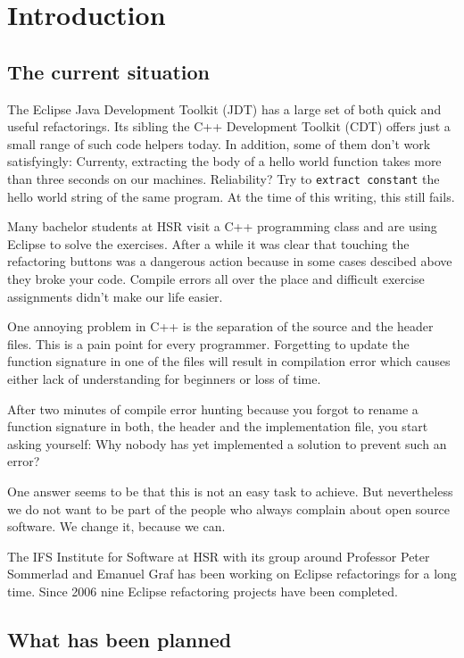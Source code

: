 \chapter{Introduction}
\thispagestyle{fancy}

\section{The current situation}

The Eclipse Java Development Toolkit (JDT) has a large set of both quick and
useful refactorings. Its sibling the C++ Development Toolkit (CDT) offers just a
small range of such code helpers today. In addition, some of them don't work
satisfyingly: Currenty, extracting the body of a hello world function takes more
than three seconds on our machines. Reliability? Try to \texttt{extract
constant} the hello world string of the same program. At the time of this 
writing, this still fails.

Many bachelor students at HSR visit a C++ programming class and are using 
Eclipse to solve the exercises. After a while it was clear that
touching the refactoring buttons was a dangerous action because in some cases
descibed above they broke your code. Compile errors all over the place and
difficult exercise assignments didn't make our life easier.

One annoying problem in C++ is the separation of the source and the header
files. This is a pain point for every programmer. Forgetting to update the
function signature in one of the files will result in compilation error which
causes either lack of understanding for beginners or loss of time.

After two minutes of compile error hunting because you forgot to rename a
function signature in both, the header and the implementation file, you start
asking yourself: Why nobody has yet implemented a solution to prevent such an
error?

One answer seems to be that this is not an easy task to achieve. But
nevertheless we do not want to be part of the people who always complain about
open source software. We change it, because we can.
 
The IFS Institute for Software at HSR with its group around Professor Peter
Sommerlad and
Emanuel Graf has been working on Eclipse refactorings for a long time. Since
2006 nine Eclipse refactoring projects have been completed.

\section{What has been planned}

